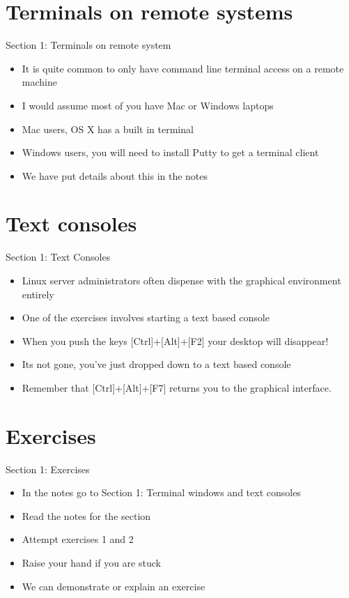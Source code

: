 \section{Terminals on remote systems}
\begin{frame}{Section 1: Terminals on remote system}
\begin{itemize}
\item It is quite common to only have command line terminal access on a remote machine
\item I would assume most of you have Mac or Windows laptops
\item Mac users, OS X has a built in terminal
\item Windows users, you will need to install Putty to get a terminal client
\item We have put details about this in the notes
\end{itemize}
\end{frame}

\section{Text consoles}
\begin{frame}{Section 1: Text Consoles}
\begin{itemize}
\item Linux server administrators often dispense with the graphical environment entirely
\item One of the exercises involves starting a text based console
\item When you push the keys [Ctrl]+[Alt]+[F2] your desktop will disappear!
\item Its not gone, you've just dropped down to a text based console
\item Remember that [Ctrl]+[Alt]+[F7] returns you to the graphical interface.
\end{itemize}
\end{frame}

\section{Exercises}
\begin{frame}{Section 1: Exercises}
\begin{itemize}
\item In the notes go to Section 1: Terminal windows and text consoles
\item Read the notes for the section 
\item Attempt exercises 1 and 2
\item Raise your hand if you are stuck
\item We can demonstrate or explain an exercise
\end{itemize}
\end{frame}